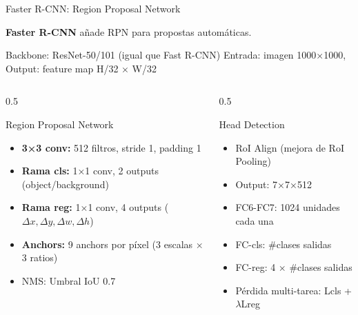 \documentclass[aspectratio=169, 10pt]{beamer}
\begin{document}
\begin{frame}[shrink]{Faster R-CNN: Region Proposal Network}

	\textbf{Faster R-CNN} a\~nade RPN para propostas autom\'aticas.

	\vspace{0.2cm}

	\begin{block}{Backbone: ResNet-50/101 (igual que Fast R-CNN)}
		Entrada: imagen 1000×1000, Output: feature map H/32 × W/32
	\end{block}

	\vspace{0.2cm}

	\begin{columns}[T]
		\begin{column}{0.5\textwidth}
			\begin{block}{Region Proposal Network}
				\small
				\begin{itemize}
					\item \textbf{3×3 conv:} 512 filtros, stride 1, padding 1
					\item \textbf{Rama cls:} 1×1 conv, 2 outputs (object/background)
					\item \textbf{Rama reg:} 1×1 conv, 4 outputs ($\Delta x, \Delta y, \Delta w, \Delta h$)
					\item \textbf{Anchors:} 9 anchors por píxel (3 escalas × 3 ratios)
					\item NMS: Umbral IoU 0.7
				\end{itemize}
			\end{block}
		\end{column}

		\begin{column}{0.5\textwidth}
			\begin{block}{Head Detection}
				\small
				\begin{itemize}
					\item RoI Align (mejora de RoI Pooling)
					\item Output: 7×7×512
					\item FC6-FC7: 1024 unidades cada una
					\item FC-cls: \#clases salidas
					\item FC-reg: 4 $\times$ \#clases salidas
					\item P\'erdida multi-tarea: Lcls + $\lambda$Lreg
				\end{itemize}
			\end{block}
		\end{column}
	\end{columns}

\end{frame}
\end{document}
